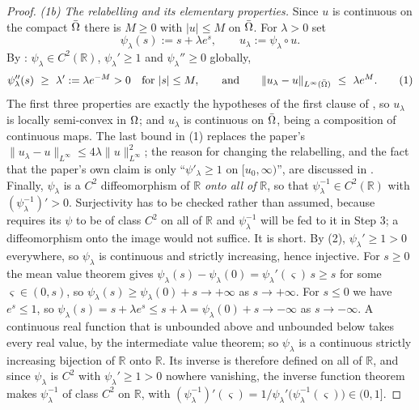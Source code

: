 \begin{proof}
\emph{(1b) The relabelling and its elementary properties.} Since $u$ is continuous on the
compact $\bar{\Omega}$ there is $M\ge0$ with $|u|\le M$ on $\bar{\Omega}$. For $\lambda>0$ set
\[
 \psi_\lambda(s):=s+\lambda e^{s},\qquad u_\lambda:=\psi_\lambda\circ u .
\]
By : $\psi_\lambda\in C^{2}(\mathbb R)$,
$\psi_\lambda'\ge1$ and $\psi_\lambda''\ge0$ globally,
\[
 \psi_\lambda''(s)\ \ge\ \lambda':=\lambda e^{-M}>0\quad\text{for }|s|\le M,
 \qquad\text{and}\qquad
 \|u_\lambda-u\|_{L^\infty(\bar\Om)}\ \le\ \lambda e^{M} . \tag{1}
\]
The first three properties are exactly the hypotheses of the first clause of
, so $u_\lambda$ is locally semi-convex in $\Omega$; and
$u_\lambda$ is continuous on $\bar{\Omega}$, being a composition of continuous maps. The last
bound in (1) replaces the paper's
$\|u_\lambda-u\|_{L^\infty}\le4\lambda\|u\|^{2}_{L^\infty}$; the reason for changing the
relabelling, and the fact that the paper's own claim is only
``$\psi'_\lambda\ge1$ on $[u_0,\infty)$'', are discussed in .
Finally, $\psi_\lambda$ is a $C^{2}$ diffeomorphism of $\mathbb R$ \emph{onto all of}
$\mathbb R$, so that $\psi_\lambda^{-1}\in C^{2}(\mathbb R)$ with
$(\psi_\lambda^{-1})'>0$. Surjectivity has to be checked rather than assumed, because
 requires its $\psi$ to be of class $C^{2}$ on all of
$\mathbb R$ and $\psi_\lambda^{-1}$ will be fed to it in Step 3; a diffeomorphism onto the
image would not suffice. It is short. By (2),
$\psi_\lambda'\ge1>0$ everywhere, so $\psi_\lambda$ is continuous and strictly increasing,
hence injective. For $s\ge0$ the mean value theorem gives
$\psi_\lambda(s)-\psi_\lambda(0)=\psi_\lambda'(\varsigma)\,s\ge s$ for some
$\varsigma\in(0,s)$, so $\psi_\lambda(s)\ge\psi_\lambda(0)+s\to+\infty$ as $s\to+\infty$.
For $s\le0$ we have $e^{s}\le1$, so
$\psi_\lambda(s)=s+\lambda e^{s}\le s+\lambda=\psi_\lambda(0)+s\to-\infty$ as
$s\to-\infty$. A continuous real function that is unbounded above and unbounded below takes
every real value, by the intermediate value theorem; so $\psi_\lambda$ is a continuous
strictly increasing bijection of $\mathbb R$ onto $\mathbb R$. Its inverse is therefore
defined on all of $\mathbb R$, and since $\psi_\lambda$ is $C^{2}$ with
$\psi_\lambda'\ge1>0$ nowhere vanishing, the inverse function theorem makes
$\psi_\lambda^{-1}$ of class $C^{2}$ on $\mathbb R$, with
$(\psi_\lambda^{-1})'(\varsigma)=1/\psi_\lambda'\big(\psi_\lambda^{-1}(\varsigma)\big)\in(0,1]$.


\end{proof}
